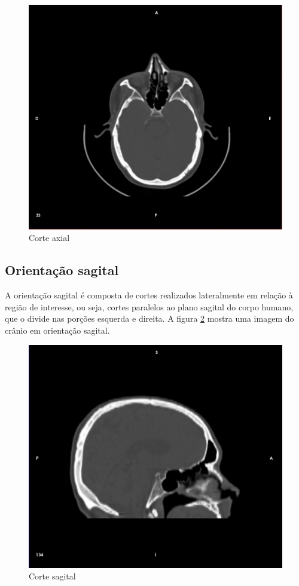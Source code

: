 \begin{figure}[!htb]
\centering
\includegraphics[scale=0.15]{../user_guide_figures/invesalius_screen/axial.jpg}
\caption{Corte axial}
\label{fig:axial_corte}
\end{figure}

\subsection{Orientação sagital}

A orientação sagital é composta de cortes realizados lateralmente
em relação à região de interesse, ou seja, cortes paralelos ao plano sagital do corpo humano,
que o divide nas porções esquerda e direita.
A figura \ref{fig:sagital_slice} mostra uma imagem do crânio em orientação sagital.

\begin{figure}[!htb]
\centering
\includegraphics[scale=0.15]{../user_guide_figures/invesalius_screen/sagital.jpg}
\caption{Corte sagital}
\label{fig:sagital_slice}
\end{figure}

